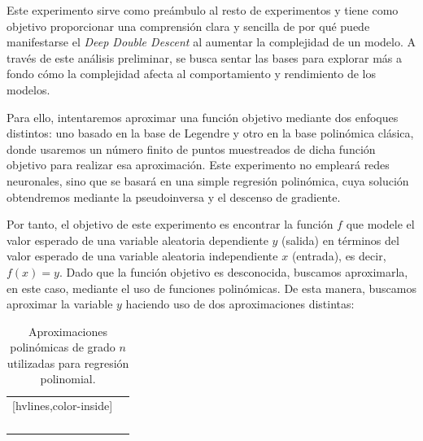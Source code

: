 Este experimento sirve como preámbulo al resto de experimentos y tiene como objetivo proporcionar una comprensión clara y sencilla de por qué puede manifestarse el \textit{Deep Double Descent} al aumentar la complejidad de un modelo. A través de este análisis preliminar, se busca sentar las bases para explorar más a fondo cómo la complejidad afecta al comportamiento y rendimiento de los modelos.\newline

Para ello, intentaremos aproximar una función objetivo mediante dos enfoques distintos: uno basado en la base de Legendre y otro en la base polinómica clásica, donde usaremos un número finito de puntos muestreados de dicha función objetivo para realizar esa aproximación. Este experimento no empleará redes neuronales, sino que se basará en una simple regresión polinómica, cuya solución obtendremos mediante la pseudoinversa y el descenso de gradiente.\newline

Por tanto, el objetivo de este experimento es encontrar la función $f$ que modele el valor esperado de una variable aleatoria dependiente $y$ (salida) en términos del valor esperado de una variable aleatoria independiente $x$ (entrada), es decir, $f(x)=y$. Dado que la función objetivo es desconocida, buscamos aproximarla, en este caso, mediante el uso de funciones polinómicas. De esta manera, buscamos aproximar la variable $y$ haciendo uso de dos aproximaciones distintas:

\begin{table}[h]
    \centering
    \begin{NiceTabular}{c c}[hvlines,color-inside]
         &  \\ 
        
         &  \\ \\

         &   \\ \\

    \end{NiceTabular}
    \caption{Aproximaciones polinómicas de grado $n$ utilizadas para regresión polinomial.}\label{tabla:aproximaciones-polinomicas}
\end{table}

